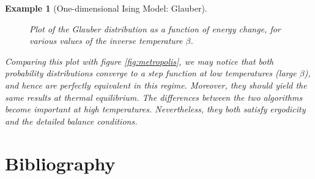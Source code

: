 \documentclass[]{article}
\numberwithin{equation}{section}
\theoremstyle{break}
\newtheorem*{example}{Example}
\begin{document}
\begin{example}[One-dimensional Ising Model: Glauber]
\begin{figure}[H]
    \caption{Plot of the Glauber distribution as a function of energy change, for various values of the inverse temperature $\beta$.}
    \label{fig:glauber}
\end{figure}

\noindent Comparing this plot with figure \ref{fig:metropolis}, we may notice that both probability distributions converge to a step function at low temperatures (large $\beta$), and hence are perfectly equivalent in this regime. Moreover, they should yield the same results at thermal equilibrium. The differences between the two algorithms become important at high temperatures. Nevertheless, they both satisfy ergodicity and the detailed balance conditions. 
\end{example}
\newpage
\section*{Bibliography}
\printbibliography[heading=none]
\end{document}
